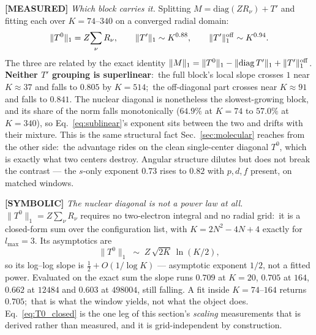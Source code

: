 \documentclass[aps,pra,twocolumn,superscriptaddress,longbibliography]{revtex4-2}
\newcommand{\gvq}[2]{#2}
\begin{document}
\textbf{[MEASURED]} \emph{Which block carries it.}  Splitting
$M=\mathrm{diag}(Z R_\nu)+T'$ and fitting each over $K=74$--$340$ on a converged
radial domain:
\begin{equation}
\|T^0\|_1 = Z\!\sum_\nu R_\nu, \qquad
\|T'\|_1 \sim K^{\gvq{p60_Tprime_full_exponent}{0.88}}, \qquad
\|T'\|_1^{\rm off} \sim K^{\gvq{p60_Tprime_exponent}{0.94}} .
\label{eq:sublinear_split}
\end{equation}
The three are related by the exact identity
$\|M\|_1=\|T^0\|_1-\|\mathrm{diag}\,T'\|_1+\|T'\|_1^{\rm off}$.
\textbf{Neither $T'$ grouping is superlinear}:\ the full block's local slope
crosses $1$ near $K\approx37$ and falls to $0.805$ by $K=514$;\ the off-diagonal
part crosses near $K\approx91$ and falls to $0.841$.  The nuclear diagonal is
nonetheless the slowest-growing block, and its share of the norm falls
monotonically ($64.9\%$ at $K=74$ to $57.0\%$ at $K=340$), so
Eq.~\eqref{eq:sublinear}'s exponent sits between the two and drifts with their
mixture.  This is the same structural fact Sec.~\ref{sec:molecular} reaches from
the other side:\ the advantage rides on the clean single-center diagonal $T^0$,
which is exactly what two centers destroy.  Angular structure dilutes but does
not break the contrast --- the $s$-only exponent
$\gvq{p60_onenorm_exponent_sonly}{0.73}$ rises to
$\gvq{p60_onenorm_exponent}{0.82}$ with $p,d,f$ present, on matched windows.

\textbf{[SYMBOLIC]} \emph{The nuclear diagonal is not a power law at all.}
$\|T^0\|_1=Z\sum_\nu R_\nu$ requires no two-electron integral and no radial
grid:\ it is a closed-form sum over the configuration list, with
$K=2N^{2}-4N+4$ exactly for $l_{\max}=3$.  Its asymptotics are
\begin{equation}
\|T^0\|_1 \;\sim\; Z\,\sqrt{2K}\,\ln(K/2),
\label{eq:T0_closed}
\end{equation}
so its log--log slope is
$\tfrac12+O(1/\log K)$ --- asymptotic exponent
$\gvq{p60_T0_asymptotic_exponent}{1/2}$, not a fitted power.  Evaluated on the
exact sum the slope runs $0.709$ at $K=20$, $0.705$ at $164$, $0.662$ at
$12484$ and $0.603$ at $498004$, still falling.  A fit inside $K=74$--$164$
returns $0.705$;\ that is what the window yields, not what the object does.
Eq.~\eqref{eq:T0_closed} is the one leg of this section's \emph{scaling}
measurements that is derived rather
than measured, and it is grid-independent by construction.
\end{document}
